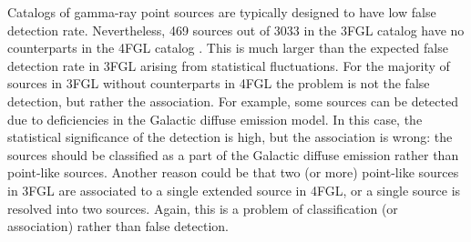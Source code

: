 Catalogs of gamma-ray point sources are typically designed to have low false detection rate. 
Nevertheless, 469 sources out of 3033 in the 3FGL catalog \citep{2015ApJS..218...23A} have no counterparts 
in the 4FGL catalog \citep{2020ApJS..247...33A}.
This is much larger than the expected false detection rate in 3FGL arising from statistical fluctuations.
For the majority of sources in 3FGL without counterparts in 4FGL the problem is not the false detection, 
but rather the association.
For example, some sources can be detected due to deficiencies in the Galactic diffuse emission model.
In this case, the statistical significance of the detection is high, but the association is wrong: the sources should be classified as
a part of the Galactic diffuse emission rather than point-like sources.
Another reason could be that two (or more) point-like sources in 3FGL are associated to a single extended source in 4FGL,
or a single source is resolved into two sources.
Again, this is a problem of classification (or association) rather than false detection.


